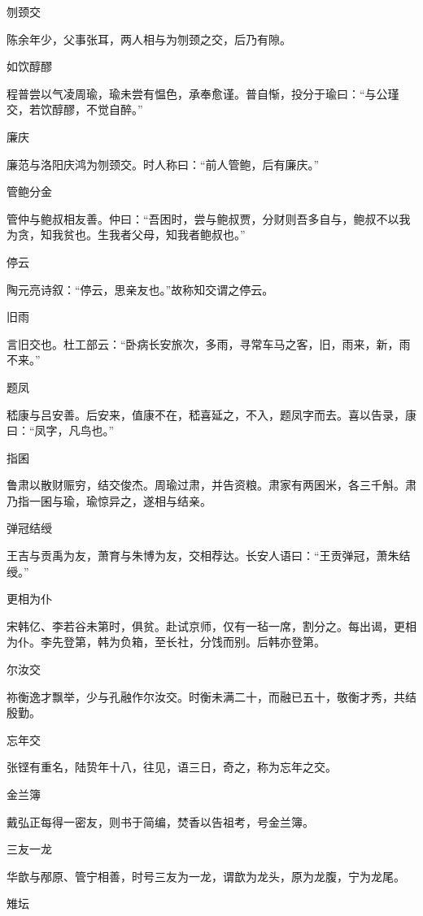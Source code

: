 \documentclass[a4paper,12pt,UTF8,twoside]{ctexbook}
\begin{document}
    刎颈交
    
    陈余年少，父事张耳，两人相与为刎颈之交，后乃有隙。
    
    如饮醇醪
    
    程普尝以气凌周瑜，瑜未尝有愠色，承奉愈谨。普自惭，投分于瑜曰：“与公瑾交，若饮醇醪，不觉自醉。”
    
    廉庆
    
    廉范与洛阳庆鸿为刎颈交。时人称曰：“前人管鲍，后有廉庆。”
    
    管鲍分金
    
    管仲与鲍叔相友善。仲曰：“吾困时，尝与鲍叔贾，分财则吾多自与，鲍叔不以我为贪，知我贫也。生我者父母，知我者鲍叔也。”
    
    停云
    
    陶元亮诗叙：“停云，思亲友也。”故称知交谓之停云。
    
    旧雨
    
    言旧交也。杜工部云：“卧病长安旅次，多雨，寻常车马之客，旧，雨来，新，雨不来。”
    
    题凤
    
    嵇康与吕安善。后安来，值康不在，嵇喜延之，不入，题凤字而去。喜以告录，康曰：“凤字，凡鸟也。”
    
    指囷
    
    鲁肃以散财赈穷，结交俊杰。周瑜过肃，并告资粮。肃家有两囷米，各三千斛。肃乃指一囷与瑜，瑜惊异之，遂相与结亲。
    
    弹冠结绶
    
    王吉与贡禹为友，萧育与朱博为友，交相荐达。长安人语曰：“王贡弹冠，萧朱结绶。”
    
    更相为仆
    
    宋韩亿、李若谷未第时，俱贫。赴试京师，仅有一毡一席，割分之。每出谒，更相为仆。李先登第，韩为负箱，至长社，分饯而别。后韩亦登第。
    
    尔汝交
    
    祢衡逸才飘举，少与孔融作尔汝交。时衡未满二十，而融已五十，敬衡才秀，共结殷勤。
    
    忘年交
    
    张铿有重名，陆贽年十八，往见，语三日，奇之，称为忘年之交。
    
    金兰簿
    
    戴弘正每得一密友，则书于简编，焚香以告祖考，号金兰簿。
    
    三友一龙
    
    华歆与邴原、管宁相善，时号三友为一龙，谓歆为龙头，原为龙腹，宁为龙尾。
    
    雉坛
    
\end{document}
